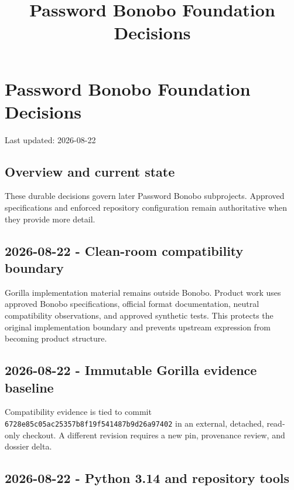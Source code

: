 \documentclass[
  letterpaper,
]{article}
\title{Password Bonobo Foundation Decisions}
\author{}
\date{}
\begin{document}
\maketitle

{
\setcounter{tocdepth}{3}
\tableofcontents
}
\section{Password Bonobo Foundation Decisions}\label{password-bonobo-foundation-decisions}

Last updated: 2026-08-22

\subsection{Overview and current state}\label{overview-and-current-state}

These durable decisions govern later Password Bonobo subprojects. Approved specifications and enforced repository
configuration remain authoritative when they provide more detail.

\subsection{2026-08-22 - Clean-room compatibility boundary}\label{2026-08-22---clean-room-compatibility-boundary}

Gorilla implementation material remains outside Bonobo. Product work uses approved Bonobo specifications, official
format documentation, neutral compatibility observations, and approved synthetic tests. This protects the original
implementation boundary and prevents upstream expression from becoming product structure.

\subsection{2026-08-22 - Immutable Gorilla evidence baseline}\label{2026-08-22---immutable-gorilla-evidence-baseline}

Compatibility evidence is tied to commit \nolinkurl{6728e85c05ac25357b8f19f541487b9d26a97402} in an external, detached,
read-only checkout. A different revision requires a new pin, provenance review, and dossier delta.

\subsection{2026-08-22 - Python 3.14 and repository tools}\label{2026-08-22---python-314-and-repository-tools}
\end{document}
